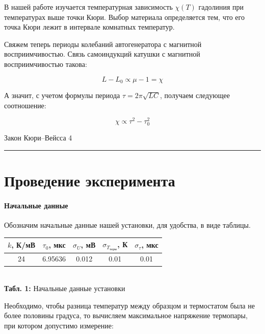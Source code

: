 \documentclass[12pt,a4paper]{scrartcl}
\begin{document}
	В нашей работе изучается температурная зависимость $\chi(T)$ гадолиния при температурах выше точки Кюри. Выбор материала определяется тем, что его точка Кюри лежит в интервале комнатных температур.
	
	
	Свяжем теперь периоды колебаний автогенератора с магнитной восприимчивостью. Связь самоиндукций катушки с магнитной восприимчивостью такова:
	
	$$L - L_0 \propto \mu - 1 = \chi$$
	
	А значит, с учетом формулы периода $\tau = 2\pi \sqrt{LC}$, получаем следующее соотношение:
	
	$$\chi \propto \tau^2 - \tau_0 ^2$$
	
	\newpage
	
	
	\begin{flushleft}
		\footnotesize{Закон Кюри–Вейсса} \hspace{\fill} \footnotesize{4}
		\\[-0.3cm]\noindent\rule{\textwidth}{0.3pt}
	\end{flushleft}
	
	\section{Проведение эксперимента}
	
	\paragraph{Начальные данные} \hfill
	
	Обозначим начальные данные нашей установки, для удобства, в виде таблицы.
	
	\begin{center}
		\begin{tabular}{|c|c|c|c|c|}
			\hline
			$k$, К/мВ & $\tau_0$, мкс & $\sigma_U$, мВ & $\sigma_{T_{\text{терм}}}$, К & $\sigma_\tau$, мкс
			\\\hline
			24 & 6.95636 & 0.012 & 0.01 & 0.01
			\\\hline
		\end{tabular}
		\\\textbf{Табл. 1:} Начальные данные установки
	\end{center}

	Необходимо, чтобы разница температур между образцом и термостатом была не более половины градуса, то вычисляем максимальное напряжение термопары, при котором допустимо измерение:
	
\end{document}
